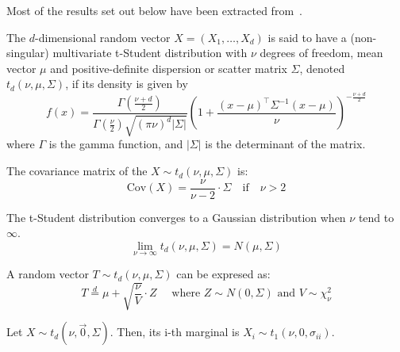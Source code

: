 \documentclass[11pt,fleqn]{book} %
\begin{document}
Most of the results set out below have been extracted from~\cite{kotz:2004}.

\begin{definition}
	The $d$-dimensional random vector $X=(X_1,\dots,X_d)$ is said to have a 
	(non-singular) multivariate t-Student distribution with $\nu$ degrees of freedom, 
	mean vector $\mu$ and positive-definite dispersion or scatter matrix $\Sigma$, 
	denoted $t_d(\nu,\mu,\Sigma)$, if its density is given by
	\begin{displaymath}
		f(x)=\frac{\Gamma\left(\frac{\nu+d}{2}\right)}{\Gamma\left(\frac{\nu}{2}\right)\sqrt{(\pi \nu)^d |\Sigma|}}
		\left(
		1+ \frac{(x-\mu)^\top\Sigma^{-1}(x-\mu)}{\nu}
		\right)^{-\frac{\nu+d}{2}}
	\end{displaymath}
	\noindent where $\Gamma$ is the gamma function, and $|\Sigma|$ is the 
	determinant of the matrix.
\end{definition}

\begin{proposition}
	The covariance matrix of the $X \sim t_d(\nu,\mu,\Sigma)$ is:
	\begin{displaymath}
		\text{Cov}(X) = \frac{\nu}{\nu-2} \cdot \Sigma \quad \text{if} \quad \nu > 2
	\end{displaymath}
\end{proposition}

\begin{proposition}
	The t-Student distribution converges to a Gaussian distribution 
	when $\nu$ tend to $\infty$.
	\begin{displaymath}
		\lim_{\nu \to \infty} t_d(\nu,\mu,\Sigma) = N(\mu,\Sigma)
	\end{displaymath}
\end{proposition}

\begin{proposition}
	\label{prop:mtschar}
	A random vector $T \sim t_d(\nu,\mu,\Sigma)$ can be expresed as:
	\begin{displaymath}
		T \stackrel{d}{=} \mu + \sqrt{\frac{\nu}{V}}\cdot Z
		\quad \text{ where } Z \sim N(0,\Sigma) \text{ and } V \sim \chi_{\nu}^2
	\end{displaymath}
\end{proposition}

\begin{proposition}
	Let $X \sim t_d(\nu,\vec{0},\Sigma)$. Then, its i-th marginal is 
	$X_i \sim t_1(\nu,0,\sigma_{ii})$.
\end{proposition}
\end{document}
